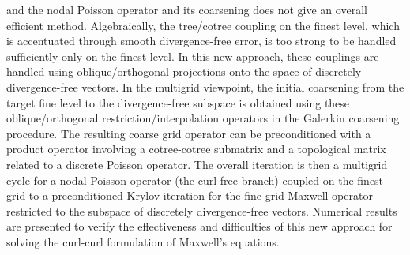 \documentclass{report}
\begin{document}
and the nodal Poisson operator and its coarsening does not give an
overall efficient method. Algebraically, the tree/cotree coupling on the
finest level, which is accentuated through smooth divergence-free
error, is too strong to be handled sufficiently only on the finest level.
In this new approach, these couplings are handled using oblique/orthogonal
projections onto the space of discretely divergence-free vectors. In the
multigrid viewpoint, the initial coarsening from the target fine level
to the divergence-free subspace is obtained using these
oblique/orthogonal restriction/interpolation operators in the Galerkin
coarsening procedure. The resulting coarse grid operator can be preconditioned
with a product operator involving a cotree-cotree submatrix and a topological
matrix related to a discrete Poisson operator. The overall iteration is
then a multigrid cycle for a nodal Poisson operator (the curl-free branch)
coupled on the finest grid to a preconditioned Krylov iteration for the fine
grid Maxwell operator restricted to the subspace of discretely divergence-free
vectors. Numerical results are presented to verify the effectiveness
and difficulties of this new approach for solving the curl-curl formulation of
Maxwell's equations.
\end{document}
